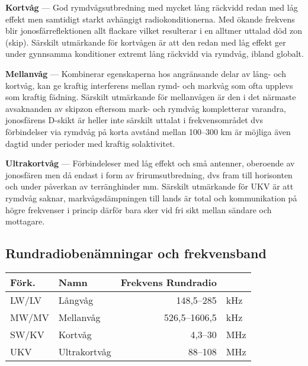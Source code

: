 \textbf{Kortvåg} --- God rymdvågsutbredning med mycket lång räckvidd redan med låg effekt men samtidigt starkt avhängigt radiokonditionerna. Med ökande frekvens blir jonosfärreflektionen allt flackare vilket resulterar i en alltmer uttalad död zon (skip). Särskilt utmärkande för kortvågen är att den redan med låg effekt ger under gynnsamma konditioner extremt lång räckvidd via rymdvåg, ibland globalt.

\textbf{Mellanvåg} --- Kombinerar egenskaperna hos angränsande delar av lång- och kortvåg, kan ge kraftig interferens mellan rymd- och markvåg som ofta upplevs som kraftig fädning. Särskilt utmärkande för mellanvågen är den i det närmaste avsaknanden av skipzon eftersom mark- och rymdvåg kompletterar varandra, jonosfärens D-skikt är heller inte särskilt uttalat i frekvensområdet dvs förbindelser via rymdvåg på korta avstånd mellan 100--300 km är möjliga även dagtid under perioder med kraftig solaktivitet.

\textbf{Ultrakortvåg} --- Förbindeleser med låg effekt och små antenner, oberoende av jonosfären men då endast i form av frirumsutbredning, dvs fram till horisonten och under påverkan av terränghinder mm. Särskilt utmärkande för UKV är att rymdvåg saknar, markvågsdämpningen till lands är total och kommunikation på högre frekvenser i princip därför bara sker vid fri sikt mellan sändare och mottagare.

\subsection{Rundradiobenämningar och frekvensband}

\begin{tabular}{llrl}
\textbf{Förk.} & \textbf{Namn} & \textbf{Frekvens Rundradio} &     \\ \hline
LW/LV          & Långvåg       & 148,5--285                  & kHz \\
MW/MV          & Mellanvåg     & 526,5--1606,5               & kHz \\
SW/KV          & Kortvåg       & 4,3--30                     & MHz \\
UKV            & Ultrakortvåg  & 88--108                     & MHz \\
\end{tabular}

